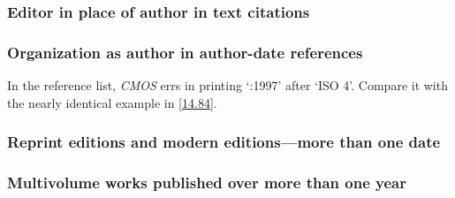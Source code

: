 \documentclass[11pt,letterpaper,oneside]{article}
\begin{document}
\subsubsection{Editor in place of author in text citations}

\begin{citeref}
\item \parencite{silverstein1974}
\item \parencite{soltes1999}
\end{citeref}

\subsubsection{Organization as author in author-date references}

In the reference list, \textit{CMOS} errs in printing `:1997' after
`ISO 4'. Compare it with the nearly identical example in \ref{14.84}.

\begin{citeref}
\item \parencite{iso1997.ref}
\end{citeref}

\setcounter{subsubsection}{39}
\subsubsection{Reprint editions and modern editions—more than one date}
\label{15.40}

\begin{citeref}
\item \parencite{austen2003}
\item \parencite{maitland1998}
\end{citeref}

\subsubsection{Multivolume works published over more than one year}
\label{15.41}

\begin{citeref}
\item \parencite[1:133]{tillich1951}
\item \parencite[329]{hayek2011}
\end{citeref}
\end{document}
